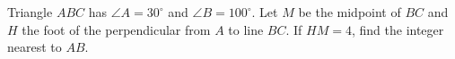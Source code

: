 Triangle $ABC$ has $\angle A=30^\circ$ and $\angle B=100^\circ$. Let $M$ be the midpoint of $BC$ and $H$ the foot of the perpendicular from $A$ to line $BC$. If $HM=4$, find the integer nearest to $AB$.
